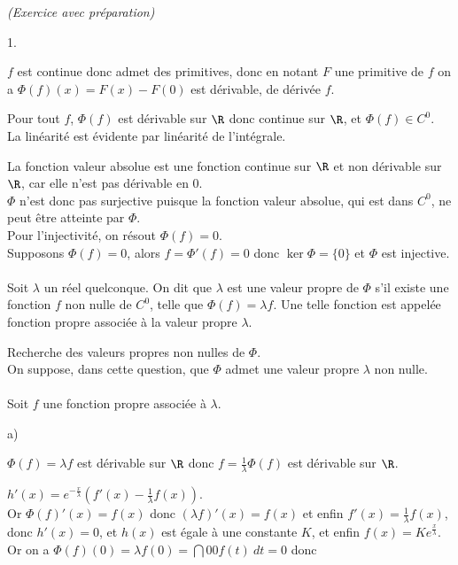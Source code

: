 \documentclass[11pt]{article}%
\begin{document}
\begin{exercice}{\it (Exercice avec préparation)}
\begin{noliste}{1.}
\[\]
 \item $f$ est continue donc admet des primitives, donc en notant $F$
une primitive de $f$ on a $\Phi (f) (x) = F(x) - F(0)$ est dérivable,
de dérivée $f$. \\
 \item Pour tout $f$, $\Phi(f)$ est dérivable sur $\R$ donc continue
sur $\R$, et $\Phi (f) \in C^{0}$. \\
 La linéarité est évidente par linéarité de l'intégrale. \\
 \item La fonction valeur absolue est une fonction continue sur $\R$ et
non dérivable sur $\R$, car elle n'est pas dérivable en 0. \\
 $\Phi$ n'est donc pas surjective puisque la fonction valeur absolue,
qui est dans $C^{0}$, ne peut être atteinte par $\Phi$. \\
 Pour l'injectivité, on résout $\Phi (f) = 0$. \\
 Supposons $\Phi (f) = 0$, alors $f = \Phi'(f) = 0$ donc $\ker \Phi =
\{ 0 \}$ et $\Phi$ est injective. \\
\\
 Soit $\lambda$ un réel quelconque. On dit que $\lambda$ est une valeur
propre de $\Phi$ s'il existe une fonction $f$ non nulle de $C^{0}$,
telle que $\Phi(f) = \lambda f$. Une telle fonction est appelée
fonction propre associée à la valeur propre $\lambda$. \\
 \item Recherche des valeurs propres non nulles de $\Phi$. \\
 On suppose, dans cette question, que $\Phi$ admet une valeur propre
$\lambda$ non nulle. \\
\\
 Soit $f$ une fonction propre associée à $\lambda$. 
 \begin{noliste}{a)}
 \setlength{\itemsep}{2mm}
 \item $\Phi (f) = \lambda f$ est dérivable sur $\R$ donc $f =
\frac{1}{\lambda} \Phi (f)$ est dérivable sur $\R$. \\
 \item $h'(x) = e^{ - \frac{x}{\lambda} } \left( f'(x) -
\frac{1}{\lambda} f(x) \right)$. \\
 Or $\Phi(f) '(x) = f(x)$ donc $(\lambda f)'(x) = f(x)$ et enfin $f'(x)
= \frac{1}{\lambda} f(x)$, donc $h'(x) = 0$, et $h(x)$ est égale à une
constante $K$, et enfin $f(x) = K e^{ \frac{x}{\lambda} }$. \\
 Or on a $\Phi (f) (0) = \lambda f(0) = \dint{0}{0} f(t)\ dt = 0$ donc

\end{noliste}
\end{noliste}
\end{exercice}
\end{document}
